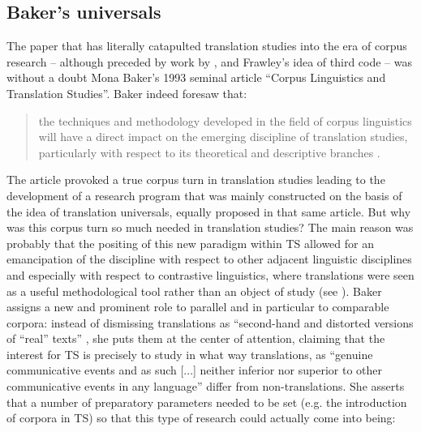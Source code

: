 \subsection{Baker’s universals}
\label{sec:2.2.2}  
\hypertarget{Bakersuniversals}{}
The paper that has literally catapulted translation studies into the era of corpus research – although preceded by work by \citet{toury_search_1980}, \citet{wollin_translationese_1986} and Frawley’s idea of third code \citep{frawley_translation:_1984} – was without a doubt Mona Baker’s 1993 seminal article “Corpus Linguistics and Translation Studies”. Baker indeed foresaw that:

\begin{quote}
the techniques and methodology developed in the field of corpus linguistics will have a direct impact on the emerging discipline of translation studies, particularly with respect to its theoretical and descriptive branches \citep[233]{baker_corpus_1993}.
\end{quote}

The article provoked a true corpus turn in translation studies leading to the development of a research program that was mainly constructed on the basis of the idea of translation universals, equally proposed in that same article. But why was this corpus turn so much needed in translation studies? The main reason was probably that the positing of this new paradigm within TS allowed for an emancipation of the discipline with respect to other adjacent linguistic disciplines and especially with respect to contrastive linguistics, where translations were seen as a useful methodological tool rather than an object of study (see ). Baker assigns a new and prominent role to parallel and in particular to comparable corpora: instead of dismissing translations as “second-hand and distorted versions of ``real'' texts” \citep[233]{baker_corpus_1993}, she puts them at the center of attention, claiming that the interest for TS is precisely to study in what way translations, as “genuine communicative events and as such [...] neither inferior nor superior to other communicative events in any language” \citep[234]{baker_corpus_1993} differ from non-translations. She asserts that a number of preparatory parameters needed to be set (e.g. the introduction of corpora in TS) so that this type of research could actually come into being:

